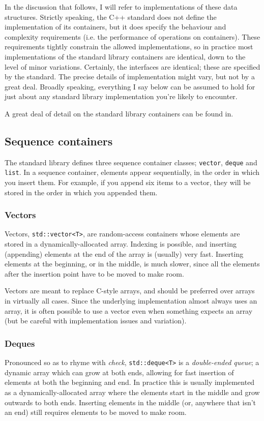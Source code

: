 \documentclass[a4paper]{scrartcl}
\begin{document}
In the discussion that follows, I will refer to implementations of these data structures. Strictly speaking, the C++ standard does not define the implementation of its containers, but it does specify the behaviour and complexity requirements (i.e. the performance of operations on containers). These requirements tightly constrain the allowed implementations, so in practice most implementations of the standard library containers are identical, down to the level of minor variations. Certainly, the interfaces are identical; these are specified by the standard. The precise details of implementation might vary, but not by a great deal. Broadly speaking, everything I say below can be assumed to hold for just about any standard library implementation you're likely to encounter.

A great deal of detail on the standard library containers can be found in\cite{StandardLibrary}.

\subsection{Sequence containers}\label{sec:containers_sequence}
The standard library defines three sequence container classes; \verb|vector|, \verb|deque| and \verb|list|. In a sequence container, elements appear sequentially, in the order in which you insert them. For example, if you append six items to a vector, they will be stored in the order in which you appended them.

\subsubsection{Vectors}\label{sec:containers_sequence_vector}
Vectors, \verb|std::vector<T>|, are random-access containers whose elements are stored in a dynamically-allocated array. Indexing is possible, and inserting (appending) elements at the end of the array is (usually) very fast. Inserting elements at the beginning, or in the middle, is much slower, since all the elements after the insertion point have to be moved to make room.

Vectors are meant to replace C-style arrays, and should be preferred over arrays in virtually all cases. Since the underlying implementation almost always uses an array, it is often possible to use a vector even when something expects an array (but be careful with implementation issues and variation).

\subsubsection{Deques}\label{sec:containers_sequence_deque}
Pronounced so as to rhyme with \emph{check}, \verb|std::deque<T>| is a \emph{double-ended queue}; a dynamic array which can grow at both ends, allowing for fast insertion of elements at both the beginning and end. In practice this is usually implemented as a dynamically-allocated array where the elements start in the middle and grow outwards to both ends. Inserting elements in the middle (or, anywhere that isn't an end) still requires elements to be moved to make room.
\end{document}
